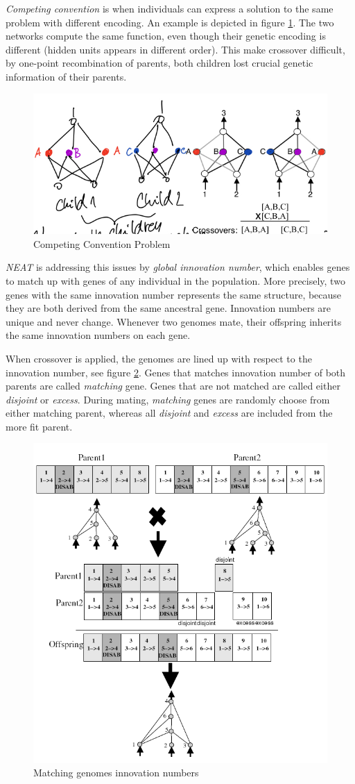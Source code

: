 \documentclass[format=acmsmall, review=false, screen=true]{acmart}
\begin{document}
\emph{Competing convention} is when individuals can express a solution to the same problem with different encoding. An example is depicted in figure \ref{fig:competing_convention}. The two networks compute the same function, even though their genetic encoding is different (hidden units appears in different order). This make crossover difficult, by one-point recombination of parents, both children lost crucial genetic information of their parents.

\begin{figure}[H]
  \includegraphics[width=0.56\linewidth]{img/competing_convention.JPEG}
  \caption{\label{fig:competing_convention}Competing Convention Problem}
\end{figure}

\emph{NEAT} is addressing this issues by \emph{global innovation number}, which enables genes to match up with genes of any individual in the population. More precisely, two genes with the same innovation number represents the same structure, because they are both derived from the same ancestral gene. Innovation numbers are unique and never change. Whenever two genomes mate, their offspring inherits the same innovation numbers on each gene.

When crossover is applied, the genomes are lined up with respect to the innovation number, see figure \ref{fig:crossover}. Genes that matches innovation number of both parents are called \emph{matching} gene. Genes that are not matched are called either \emph{disjoint} or \emph{excess}. During mating, \emph{matching} genes are randomly choose from either matching parent, whereas all \emph{disjoint} and \emph{excess} are included from the more fit parent.

\begin{figure}[H]
  \includegraphics[width=0.5\linewidth]{img/crossover.PNG}
  \caption{\label{fig:crossover}Matching genomes innovation numbers}
\end{figure}
\end{document}

